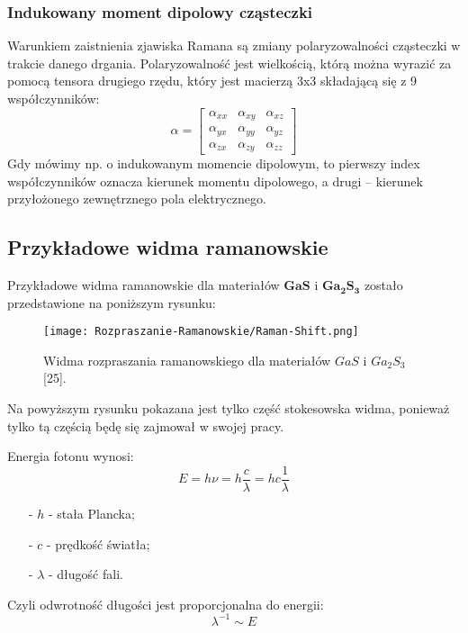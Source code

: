 \subsubsection{Indukowany moment dipolowy cząsteczki}
Warunkiem zaistnienia zjawiska Ramana są zmiany polaryzowalności cząsteczki w trakcie danego drgania. Polaryzowalność jest wielkością, którą można wyrazić za pomocą tensora drugiego rzędu, który jest macierzą 3x3 składającą się z 9 współczynników:
\begin{equation}
	\alpha = 
	\begin{bmatrix}
	\alpha_{xx} & \alpha_{xy} & \alpha_{xz} \\
	\alpha_{yx} & \alpha_{yy} & \alpha_{yz} \\
	\alpha_{zx} & \alpha_{zy} & \alpha_{zz}
	\end{bmatrix}
\end{equation}
Gdy mówimy np. o indukowanym momencie dipolowym, to pierwszy index współczynników oznacza kierunek momentu dipolowego, a drugi -- kierunek przyłożonego zewnętrznego pola elektrycznego.

\newpage
\subsection{Przykładowe widma ramanowskie}
Przykładowe widma ramanowskie dla materiałów $\mathbf{GaS}$ i $\mathbf{Ga_{2}S_{3}}$ zostało przedstawione na poniższym rysunku:
\begin{figure}[H]
	\begin{center}
		\texttt{[image: Rozpraszanie-Ramanowskie/Raman-Shift.png]}
		\caption{Widma rozpraszania ramanowskiego dla materiałów $GaS$ i $Ga_{2}S_{3}$ [25].}
	\end{center}
\end{figure}
Na powyższym rysunku pokazana jest tylko część stokesowska widma, ponieważ tylko tą częścią będę się zajmował w swojej pracy.

Energia fotonu wynosi:
\begin{equation}
	E = h \nu = h \frac{c}{\lambda} = hc \frac{1}{\lambda} 
\end{equation}
\begin{itemize}
	\item[-]{$h$ - stała Plancka};
	\item[-]{$c$ - prędkość światła};
	\item[-]{$\lambda$ - długość fali}.
\end{itemize}
Czyli odwrotność długości jest proporcjonalna do energii:
\begin{equation}
	\lambda^{-1} \sim E
\end{equation}

